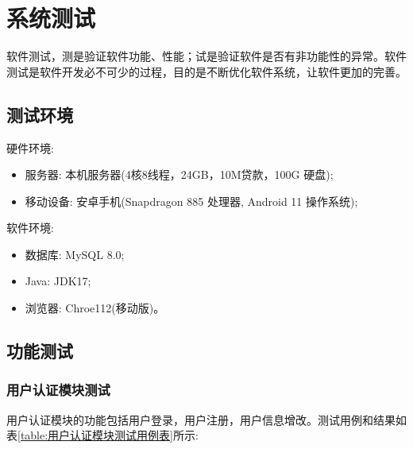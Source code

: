 \section{系统测试}

软件测试，测是验证软件功能、性能；试是验证软件是否有非功能性的异常。软件测试是软件开发必不可少的过程，目的是不断优化软件系统，让软件更加的完善。

\subsection{测试环境}

硬件环境:
\begin{itemize}
  \item 服务器: 本机服务器(4核8线程，24GB，10M贷款，100G 硬盘);
  \item 移动设备: 安卓手机(Snapdragon 885 处理器, Android 11 操作系统);
\end{itemize}

软件环境:
\begin{itemize}
  \item 数据库: MySQL 8.0;
  \item Java: JDK17;
  \item 浏览器: Chroe112(移动版)。
\end{itemize}

\subsection{功能测试}

\subsubsection{用户认证模块测试}

用户认证模块的功能包括用户登录，用户注册，用户信息增改。测试用例和结果如表\ref{table:用户认证模块测试用例表}所示:

